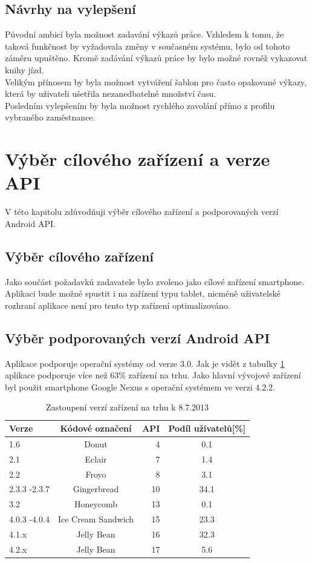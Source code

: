 \documentclass{diplomka}
\begin{document}
\subsection{Návrhy na vylepšení}
Původní ambicí byla možnost zadavání výkazů práce. Vzhledem k tomu, že taková funkčnost by vyžadovala změny v současném systému, bylo od tohoto záměru upuštěno. Kromě zadávání výkazů práce by bylo možné rovněž vykazovat knihy jízd.\\ \indent
Velikým přínosem by byla možnost vytváření šablon pro často opakované výkazy, která by uživateli ušetřila nezanedbatelné množství času.\\ \indent
Posledním vylepšením by byla možnost rychlého zavolání přímo z profilu vybraného zaměstnance.
  
\section{Výběr cílového zařízení a verze API}
V této kapitolu zdůvodňuji výběr cílového zařízení a podporovaných verzí Android API.
\subsection{Výběr cílového zařízení}
Jako součást požadavků zadavatele bylo zvoleno jako cílové zařízení smartphone. Aplikaci bude možné spustit i na zařízení typu tablet, nicméně uživatelské rozhraní aplikace není pro tento typ zařízení optimalizováno.

\subsection{Výběr podporovaných verzí Android API}
Aplikace podporuje operační systémy od verze 3.0. Jak je vidět z tabulky \ref{tab:share} aplikace podporuje více než 63\% zařízení na trhu. Jako hlavní vývojové zařízení byl použit smartphone Google Nexus s operační systémem ve verzi 4.2.2.


\begin{table}[H]\footnotesize
\begin{center}
  \begin{tabular}{| l | c | r | c |}
    \hline
Verze&Kódové označení&API&Podíl uživatelů[\%]\\ \hline
  1.6&Donut&4&0.1\\ \hline
2.1&Eclair&7&1.4\\ \hline
2.2&Froyo&8&3.1\\ \hline
2.3.3 -2.3.7&Gingerbread&10&34.1\\ \hline
3.2&Honeycomb&13&0.1\\ \hline
4.0.3 -4.0.4&Ice Cream Sandwich&15&23.3\\ \hline
4.1.x&Jelly Bean&16&32.3\\ \hline
4.2.x&Jelly Bean&17&5.6\\ \hline
  \end{tabular}
\end{center}
\caption{Zastoupení verzí zařízení na trhu k 8.7.2013\cite{share}}
\label{tab:share}
\end{table}
\end{document}
